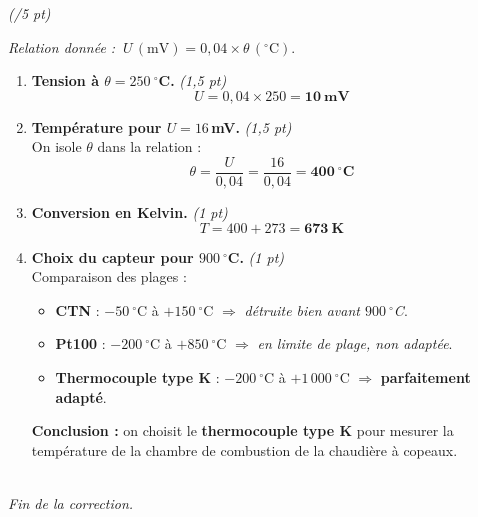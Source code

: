 \documentclass[a4paper,11pt]{article}
\begin{document}
\vspace{10pt}
 \hfill\textit{\small(/5 pt)}

\vspace{2pt}
\textit{Relation donnée :} $\ U\,(\text{mV}) = 0{,}04 \times \theta\,(^\circ\text{C})$.

\begin{enumerate}[label=\textbf{\arabic*.},leftmargin=*,itemsep=4pt]

\item \textbf{Tension à $\theta = 250\ ^\circ$C.} \hfill\textit{\small(1,5 pt)}
\[ U = 0{,}04 \times 250 = \mathbf{10\ \text{mV}} \]

\item \textbf{Température pour $U = 16$\,mV.} \hfill\textit{\small(1,5 pt)}\\
On isole $\theta$ dans la relation :
\[ \theta = \frac{U}{0{,}04} = \frac{16}{0{,}04} = \mathbf{400\ ^\circ\text{C}} \]

\item \textbf{Conversion en Kelvin.} \hfill\textit{\small(1 pt)}
\[ T = 400 + 273 = \mathbf{673\ \text{K}} \]

\item \textbf{Choix du capteur pour $900\ ^\circ$C.} \hfill\textit{\small(1 pt)}\\
Comparaison des plages :
\begin{itemize}[leftmargin=*,itemsep=1pt,topsep=2pt]
  \item \textbf{CTN} : $-50\ ^\circ$C à $+150\ ^\circ$C $\Rightarrow$ \textcolor{gris}{\emph{détruite bien avant $900\ ^\circ$C}}.
  \item \textbf{Pt100} : $-200\ ^\circ$C à $+850\ ^\circ$C $\Rightarrow$ \textcolor{gris}{\emph{en limite de plage, non adaptée}}.
  \item \textbf{Thermocouple type K} : $-200\ ^\circ$C à $+1\,000\ ^\circ$C $\Rightarrow$ \textbf{parfaitement adapté}.
\end{itemize}
\textbf{Conclusion :} on choisit le \textbf{thermocouple type K} pour mesurer la température de la chambre de combustion de la chaudière à copeaux.

\end{enumerate}

\vspace{10pt}
\hrulefill\\[2pt]
\hfill\textit{\small Fin de la correction.}
\end{document}
